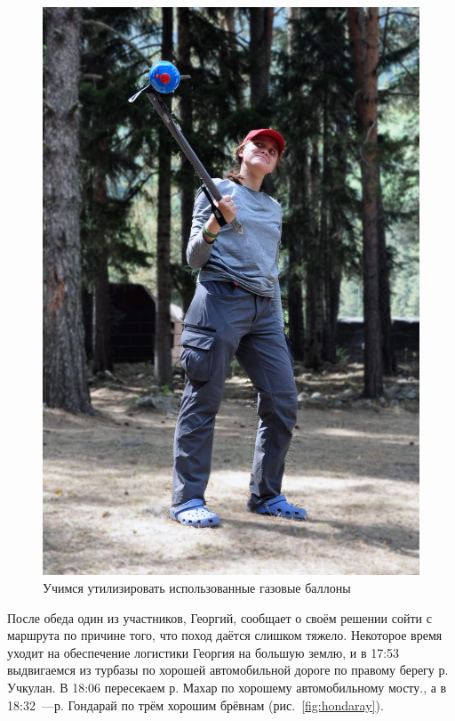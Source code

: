 \begin{figure}[h!]
\begin{minipage}[h]{0.35\linewidth}
		\includegraphics[width=\linewidth]{../pics/DSC_1152.jpg}
	\end{minipage}
	\caption{Учимся утилизировать использованные газовые баллоны \smiley}
	\label{fig:DSC_1150}
\end{figure}

После обеда один из участников, Георгий, сообщает о своём решении сойти с маршрута по причине того, что поход даётся слишком тяжело. Некоторое время уходит на обеспечение логистики Георгия на большую землю, и в 17:53 выдвигаемся из турбазы по хорошей автомобильной дороге по правому берегу р. Учкулан. В 18:06 пересекаем р. Махар по хорошему автомобильному мосту., а в 18:32~---р. Гондарай по трём хорошим брёвнам (рис.~\ref{fig:hondaray}).

